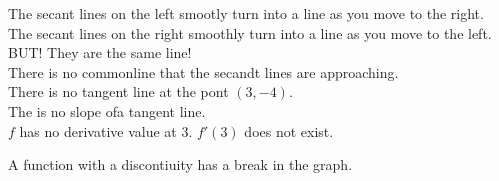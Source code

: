 \documentclass{ximera}
\begin{document}
The secant lines on the left smootly turn into a line as you move to the right. The secant lines on the right smoothly turn into a line as you move to the left. \\

BUT!  They are the same line! \\


There is no commonline that the secandt lines are approaching. \\

There is no tangent line at the pont $(3,-4)$. \\

The is no slope ofa tangent line. \\

$f$ has no derivative value at $3$.  $f'(3)$ does not exist.



































A function with a discontiuity has a break in the graph.
\end{document}

